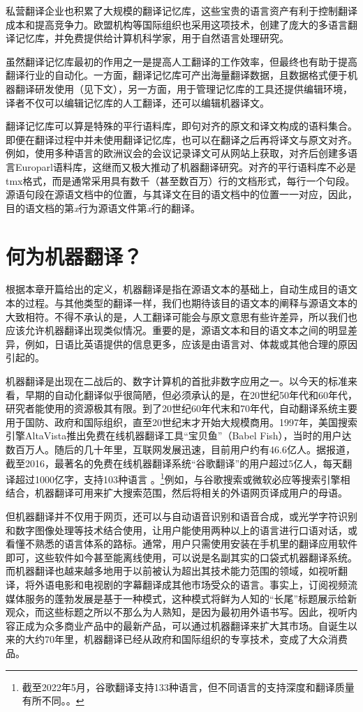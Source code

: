 \documentclass[output=paper]{langscibook}
\begin{document}
私营翻译企业也积累了大规模的翻译记忆库，这些宝贵的语言资产有利于控制翻译成本和提高竞争力。欧盟机构等国际组织也采用这项技术，创建了庞大的多语言翻译记忆库，并免费提供给计算机科学家，用于自然语言处理研究。

虽然翻译记忆库最初的作用之一是提高人工翻译的工作效率，但最终也有助于提高翻译行业的自动化。一方面，翻译记忆库可产出海量翻译数据，且数据格式便于机器翻译研发使用（见下文），另一方面，用于管理记忆库的工具还提供编辑环境，译者不仅可以编辑记忆库的人工翻译，还可以编辑机器译文。

翻译记忆库可以算是特殊的平行语料库，即句对齐的原文和译文构成的语料集合。即便在翻译过程中并未使用翻译记忆库，也可以在翻译之后再将译文与原文对齐。例如，使用多种语言的欧洲议会的会议记录译文可从网站上获取，对齐后创建多语言Europarl语料库\citep{Koehn2005}，这继而又极大推动了机器翻译研究。对齐的平行语料库不必是tmx格式，而是通常采用具有数千（甚至数百万）行的文档形式，每行一个句段。源语句段在源语文档中的位置，与其译文在目的语文档中的位置一一对应，因此，目的语文档的第\textit{x}行为源语文件第\textit{x}行的翻译。

\section{何为机器翻译？}
根据本章开篇给出的定义，机器翻译是指在源语文本的基础上，自动生成目的语文本的过程。与其他类型的翻译一样，我们也期待该目的语文本的阐释与源语文本的大致相符。不得不承认的是，人工翻译可能会与原文意思有些许差异，所以我们也应该允许机器翻译出现类似情况。重要的是，源语文本和目的语文本之间的明显差异，例如，日语比英语提供的信息更多，应该是由语言对、体裁或其他合理的原因引起的。

机器翻译是出现在二战后的、数字计算机的首批非数字应用之一。以今天的标准来看，早期的自动化翻译似乎很简陋，但必须承认的是，在20世纪50年代和60年代，研究者能使用的资源极其有限\citep{Hutchins2000}。到了20世纪60年代末和70年代，自动翻译系统主要用于国防、政府和国际组织，直至20世纪末才开始大规模商用。1997年，美国搜索引擎AltaVista推出免费在线机器翻译工具“宝贝鱼”（Babel Fish），当时的用户达数百万人。随后的几十年里，互联网发展迅速，目前用户约有46.6亿人\citep{Johnson2021}。据报道，截至2016，最著名的免费在线机器翻译系统“谷歌翻译”的用户超过5亿人，每天翻译超过1000亿字，支持103种语言 \citep{Turovsky2016}。\footnote{截至2022年5月，谷歌翻译支持133种语言，但不同语言的支持深度和翻译质量有所不同。\citep{Caswell2022}。}例如，与谷歌搜索或微软必应等搜索引擎相结合，机器翻译可用来扩大搜索范围，然后将相关的外语网页译成用户的母语。

但机器翻译并不仅用于网页，还可以与自动语音识别和语音合成，或光学字符识别和数字图像处理等技术结合使用，让用户能使用两种以上的语言进行口语对话，或看懂不熟悉的语言体系的路标。通常，用户只需使用安装在手机里的翻译应用软件即可，这些软件如今甚至能离线使用，可以说是名副其实的口袋式机器翻译系统。而机器翻译也越来越多地用于以前被认为超出其技术能力范围的领域，如视听翻译，将外语电影和电视剧的字幕翻译成其他市场受众的语言。事实上，订阅视频流媒体服务的蓬勃发展是基于一种模式，这种模式将鲜为人知的“长尾”标题展示给新观众，而这些标题之所以不那么为人熟知，是因为最初用外语书写。因此，视听内容正成为众多商业产品中的最新产品，可以通过机器翻译来扩大其市场。自诞生以来的大约70年里，机器翻译已经从政府和国际组织的专享技术，变成了大众消费品。
\end{document}
